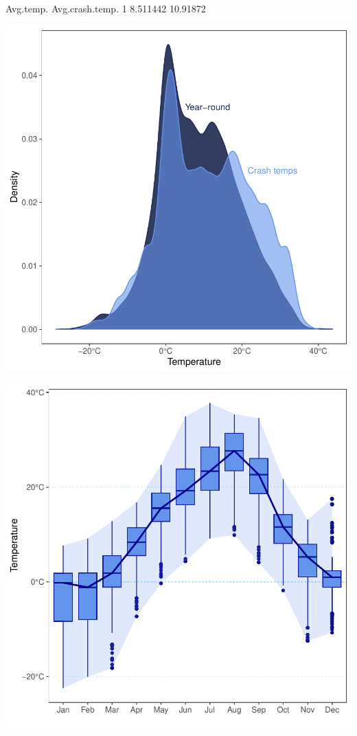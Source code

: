 \documentclass[11pt, a4paper]{article}
\begin{document}
\begin{Schunk}
\begin{Soutput}
  Avg.temp. Avg.crash.temp.
1  8.511442        10.91872
\end{Soutput}
\end{Schunk}
\includegraphics{variableinvestigation-008}



\includegraphics{variableinvestigation-009}
\end{document}
